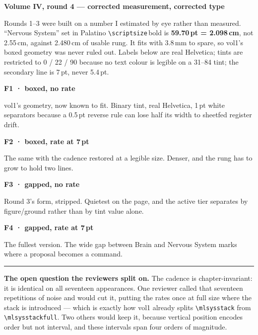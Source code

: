 \documentclass[11pt]{book}
\begin{document}
\thispagestyle{empty}
{\large\bfseries Volume IV, round 4 --- corrected measurement, corrected type}\par\vspace{2pt}
{\footnotesize Rounds 1--3 were built on a number I estimated by eye rather than measured.
``Nervous System'' set in Palatino \texttt{\textbackslash scriptsize}\,bold is
\textbf{59.70\,pt = 2.098\,cm}, not 2.55\,cm, against 2.480\,cm of usable rung. It fits with
3.8\,mm to spare, so vol1's boxed geometry was never ruled out. Labels below are real
Helvetica; tints are restricted to 0 / 22 / 90 because no text colour is legible on a
31--84 tint; the secondary line is 7\,pt, never 5.4\,pt.}\par\vspace{8mm}
\newcommand{\slot}[3]{\begin{minipage}[t][6.6cm][t]{5.0cm}#1\par\vspace{4mm}%
  {\footnotesize\bfseries #2}\par{\fontsize{7.4}{9}\selectfont #3}\end{minipage}}
\noindent
\slot{}{F1 · boxed, no rate}{vol1's geometry, now known to fit. Binary tint, real
Helvetica, 1\,pt white separators because a 0.5\,pt reverse rule can lose half its width to
sheetfed register drift.}\hfill
\slot{}{F2 · boxed, rate at 7\,pt}{The same with the cadence restored at a legible
size. Denser, and the rung has to grow to hold two lines.}\hfill
\slot{}{F3 · gapped, no rate}{Round 3's form, stripped. Quietest on the page, and
the active tier separates by figure/ground rather than by tint value alone.}\hfill
\slot{}{F4 · gapped, rate at 7\,pt}{The fullest version. The wide gap between Brain
and Nervous System marks where a proposal becomes a command.}
\par\vspace{2mm}\rule{\textwidth}{0.4pt}\par\vspace{2mm}
{\footnotesize\textbf{The open question the reviewers split on.} The cadence is
chapter-invariant: it is identical on all seventeen appearances. One reviewer called that
seventeen repetitions of noise and would cut it, putting the rates once at full size where the
stack is introduced --- which is exactly how vol1 already splits
\texttt{\textbackslash mlsysstack} from \texttt{\textbackslash mlsysstackfull}. Two others
would keep it, because vertical position encodes order but not interval, and these intervals
span four orders of magnitude.}
\end{document}
